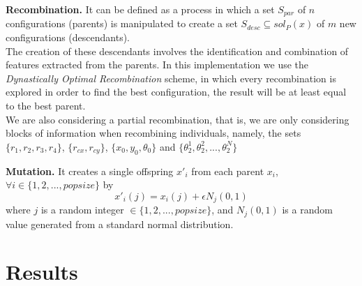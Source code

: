 \documentclass[]{beamer}
\begin{document}
{{\textbf{Recombination.} It can be defined as a process in which a set $S_{par}$ of $n$ configurations (parents) is manipulated to create a set $S_{desc} \subseteq sol_P (x)$ of $m$ new configurations (descendants). \\
 \vspace{0.5cm}
The creation of these descendants involves the identification and combination of features extracted from the
parents. In this implementation we use the \emph{Dynastically Optimal Recombination} scheme, in which every recombination is explored in order to find the best configuration, the result will be at least equal to the best parent. \\
 \vspace{0.5cm}
We are also considering a partial recombination, that is, we are only considering blocks of information when recombining individuals, namely, the sets $\{r_1,r_2,r_3,r_4\}$, $\{r_{cx},r_{cy}\}$, $\{x_0,y_0,\theta_0\}$ and $\{\theta_2^1,\theta_2^2,...,\theta_2^N\}$\\
 }  
 {
 \textbf{Mutation.} It creates a single offspring $x'_i$ from each parent $x_i$, $\forall i \in \{1,2,...,popsize\}$ by
 $$x'_i(j)=x_i(j)+\epsilon N_j(0,1)$$
 where $j$ is a random integer $\in \{1,2,...,popsize\}$, and $N_j(0,1)$ is a random value generated from a standard normal distribution.
  
 }  

}

\section{Results}

\end{document}
